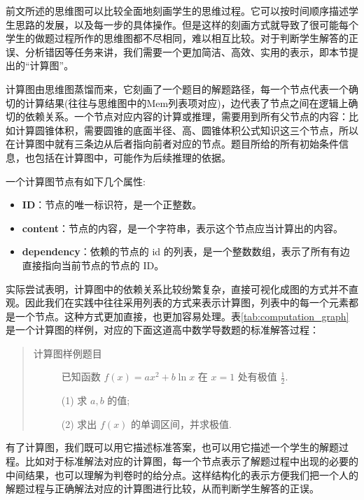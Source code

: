 前文所述的思维图可以比较全面地刻画学生的思维过程。它可以按时间顺序描述学生思路的发展，以及每一步的具体操作。但是这样的刻画方式就导致了很可能每个学生的做题过程所作的思维图都不尽相同，难以相互比较。对于判断学生解答的正误、分析错因等任务来讲，我们需要一个更加简洁、高效、实用的表示，即本节提出的“计算图”。

计算图由思维图蒸馏而来，它刻画了一个题目的解题路径，每一个节点代表一个确切的计算结果(往往与思维图中的Mem列表项对应)，边代表了节点之间在逻辑上确切的依赖关系。一个节点对应内容的计算或推理，需要用到所有父节点的内容：比如计算圆锥体积，需要圆锥的底面半径、高、圆锥体积公式知识这三个节点，所以在计算图中就有三条边从后者指向前者对应的节点。题目所给的所有初始条件信息，也包括在计算图中，可能作为后续推理的依据。

一个计算图节点有如下几个属性:
\begin{itemize}
    \item \textbf{ID}：节点的唯一标识符，是一个正整数。
    \item \textbf{content}：节点的内容，是一个字符串，表示这个节点应当计算出的内容。
    \item \textbf{dependency}：依赖的节点的 id 的列表，是一个整数数组，表示了所有有边直接指向当前节点的节点的 ID。
\end{itemize}

实际尝试表明，计算图中的依赖关系比较纷繁复杂，直接可视化成图的方式并不直观。因此我们在实践中往往采用列表的方式来表示计算图，列表中的每一个元素都是一个节点。这种方式更加直接，也更加容易处理。表\ref{tab:computation_graph} 是一个计算图的样例，对应的下面这道高中数学导数题的标准解答过程：

\begin{quote}
    \begin{description}
        \item[计算图样例题目] 已知函数 $f(x) = ax^2 + b \ln x$ 在 $x=1$ 处有极值 $\frac{1}{2}$.

        (1) 求 $a, b$ 的值;

        (2) 求出 $f(x)$ 的单调区间，并求极值.

    \end{description}
\end{quote}

有了计算图，我们既可以用它描述标准答案，也可以用它描述一个学生的解题过程。比如对于标准解法对应的计算图，每一个节点表示了解题过程中出现的必要的中间结果，也可以理解为判卷时的给分点。这样结构化的表示方便我们把一个人的解题过程与正确解法对应的计算图进行比较，从而判断学生解答的正误。




